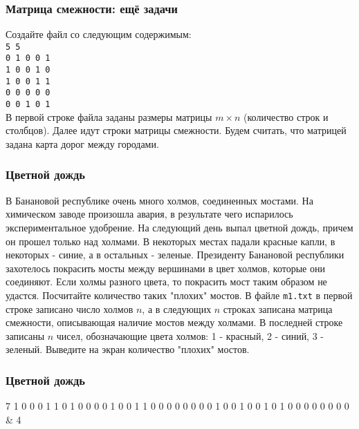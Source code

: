 \begin{frame}
	\frametitle{Матрица смежности: ещё задачи}
	Создайте файл  со следующим содержимым: \\
	{\tt 5 5 \\ 0 1 0 0 1 \\ 1 0 0 1 0 \\ 1 0 0 1 1 \\ 0 0 0 0 0 \\ 0 0 1 0 1 \\}
	В первой строке файла заданы размеры матрицы $m \times n$ (количество строк и
	столбцов). Далее идут строки матрицы смежности. Будем считать, что матрицей
	задана карта дорог между городами. \\
\end{frame}

\begin{frame}
	\frametitle{Цветной дождь}
В Банановой республике очень много холмов, соединенных мостами. На химическом
	заводе произошла авария, в результате чего испарилось экспериментальное
	удобрение. На следующий день выпал цветной дождь, причем он прошел только над
	холмами. В некоторых местах падали красные капли, в некоторых - синие, а в
	остальных - зеленые.  Президенту Банановой республики захотелось покрасить
	мосты между вершинами в цвет холмов, которые они соединяют. Если холмы разного
	цвета, то покрасить мост таким образом не удастся. Посчитайте количество таких
	"плохих" мостов.  
	\inp
	В файле {\tt m1.txt} в первой строке записано число холмов $n$, а в следующих
	$n$ строках записана матрица смежности, описывающая наличие мостов между
	холмами. В последней строке записаны $n$ чисел, обозначающие цвета холмов: 1 -
	красный, 2 - синий, 3 - зеленый.
	\out
	Выведите на экран количество "плохих" мостов.
\end{frame}

\begin{frame}
	\frametitle{Цветной дождь}
	\leavevmode
	\begin{ex}
7  1 0 0 0 1 1  0 1 0 0 0 0  1 0 0 1 1 0  0 0 0 0 0 0  0 1 0 0 1 0  0 1 0 1 0 0  0 0 0 0 0 0 \newline & 4 \tb
	\end{ex}
\end{frame}

